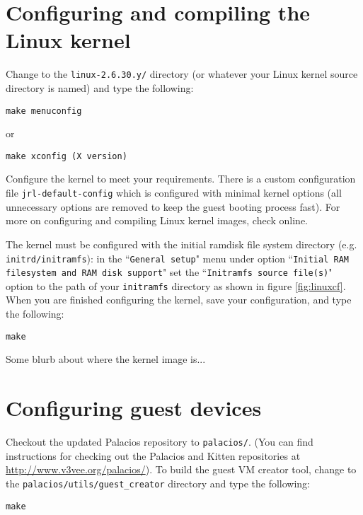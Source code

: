 \documentclass{article}[11pt]
\begin{document}
\section{Configuring and compiling the Linux kernel}

Change to the \verb|linux-2.6.30.y/| directory (or whatever your Linux kernel
source directory is named) and type the following:

\begin{verbatim}
make menuconfig
\end{verbatim}
or
\begin{verbatim}
make xconfig (X version)
\end{verbatim}

\vspace{10pt}
\noindent
Configure the kernel to meet your requirements. There is a custom configuration
file \verb|jrl-default-config| which is configured with minimal kernel options
(all unnecessary options are removed to keep the guest booting process fast).
For more on configuring and compiling Linux kernel images, check online.

\vspace{5pt}
\noindent
The kernel must be configured with the initial ramdisk file system directory
(e.g. \verb|initrd/initramfs|): in the ``\verb|General setup|" menu under
option
``\verb|Initial RAM filesystem and RAM disk support|" set the
``\verb|Initramfs source file(s)|" option to the path of your \verb|initramfs|
directory as shown in figure \ref{fig:linuxcf}. When you are finished
configuring the kernel, save your configuration, and type the following:
\begin{verbatim}
make
\end{verbatim}
Some blurb about where the kernel image is...


\section{Configuring guest devices}

Checkout the updated Palacios repository to \verb|palacios/|.  (You can find
instructions for checking out the Palacios and Kitten repositories at
\url{http://www.v3vee.org/palacios/}). To build the guest VM creator tool,
change to the \verb|palacios/utils/guest_creator| directory and type the
following:

\begin{verbatim}
make
\end{verbatim}
\end{document}
